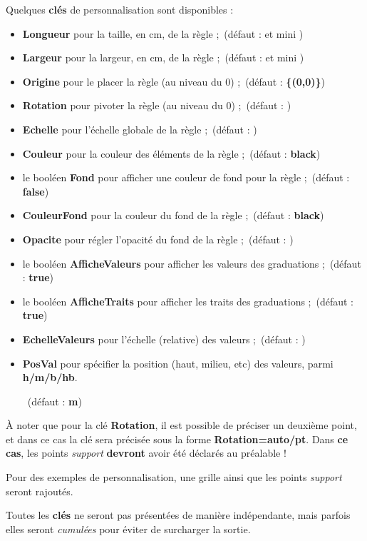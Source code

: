 \documentclass[french,a4paper,11pt]{article}
\newcommand\Cle[1]{{\bfseries\sffamily\textlangle #1\textrangle}}
\begin{document}
\begin{tipblock}
Quelques \Cle{clés} de personnalisation sont disponibles :

\begin{itemize}
	\item \Cle{Longueur} pour la taille, en cm, de la règle ;\hfill~(défaut : \Cle{12} et mini \Cle{3})
	\item \Cle{Largeur} pour la largeur, en cm, de la règle ;\hfill~(défaut : \Cle{1.5} et mini \Cle{1.25})
	\item \Cle{Origine} pour le placer la règle (au niveau du $0$) ;\hfill~(défaut : \Cle{\{(0,0)\}})
	\item \Cle{Rotation} pour pivoter la règle (au niveau du $0$) ;\hfill~(défaut : \Cle{0})
	\item \Cle{Echelle} pour l'échelle globale de la règle ;\hfill~(défaut : \Cle{1})
	\item \Cle{Couleur} pour la couleur des éléments de la règle ;\hfill~(défaut : \Cle{black})
	\item le booléen \Cle{Fond} pour afficher une couleur de fond pour la règle ;\hfill~(défaut : \Cle{false})
	\item \Cle{CouleurFond} pour la couleur du fond de la règle ;\hfill~(défaut : \Cle{black})
	\item \Cle{Opacite} pour régler l'opacité du fond de la règle ;\hfill~(défaut : \Cle{0.5})
	\item le booléen \Cle{AfficheValeurs} pour afficher les valeurs des graduations ;\hfill~(défaut : \Cle{true})
	\item le booléen \Cle{AfficheTraits} pour afficher les traits des graduations ;\hfill~(défaut : \Cle{true})
	\item \Cle{EchelleValeurs} pour l'échelle (relative) des valeurs ;\hfill~(défaut : \Cle{0.8})
	\item \Cle{PosVal} pour spécifier la position (haut, milieu, etc) des valeurs, parmi \Cle{h/m/b/hb}.
	
	\hfill~(défaut : \Cle{m})
\end{itemize}

À noter que pour la clé \Cle{Rotation}, il est possible de préciser un deuxième point, et dans ce cas la clé sera précisée sous la forme \Cle{Rotation=auto/pt}. Dans \textbf{ce cas}, les points \textit{support} \textbf{devront} avoir été déclarés au préalable !
\end{tipblock}

\begin{noteblock}
Pour des exemples de personnalisation, une grille ainsi que les points \textit{support} seront rajoutés.

\smallskip

Toutes les \Cle{clés} ne seront pas présentées de manière indépendante, mais parfois elles seront \textit{cumulées} pour éviter de surcharger la sortie.
\end{noteblock}
\end{document}
